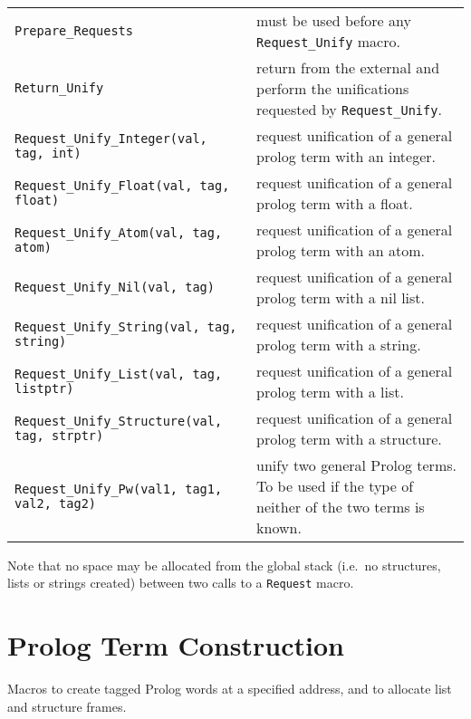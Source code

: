 \noindent
 \\
\begin{tabular}{|p{8.3cm}p{7.0cm}|} 
\hline
{\tt Prepare_Requests} & must be used before any {\tt Request_Unify} macro. \\

{\tt Return_Unify} & return from the external and perform the
unifications requested by {\tt Request_Unify}. \\

{\tt Request_Unify_Integer(val, tag, int)} & request unification of a general prolog term with an integer. \\ 

{\tt Request_Unify_Float(val, tag, float)} & request unification of a general prolog term with a float. \\ 

{\tt Request_Unify_Atom(val, tag, atom)} & request unification of a general prolog term with an atom. \\

{\tt Request_Unify_Nil(val, tag)} & request unification of a general prolog term with a nil list. \\

{\tt Request_Unify_String(val, tag, string)} & request unification of a general prolog term with a string. \\

{\tt Request_Unify_List(val, tag, listptr)} & request unification of a general prolog term with a list. \\ 

{\tt Request_Unify_Structure(val, tag, strptr)} & request unification of a general prolog term with a structure. \\

{\tt Request_Unify_Pw(val1, tag1, val2, tag2)} & unify two general Prolog terms.  To be used if
the type of neither of the two terms is
known. \\ 
\hline
\end{tabular}

\vspace{0.5cm}

Note that no space may be allocated from the global stack
(i.e.\ no structures, lists or strings created) between two
calls to a {\tt Request} macro.

\section{Prolog Term Construction}
Macros to create tagged Prolog words at a specified address, and to
allocate list and structure frames.

